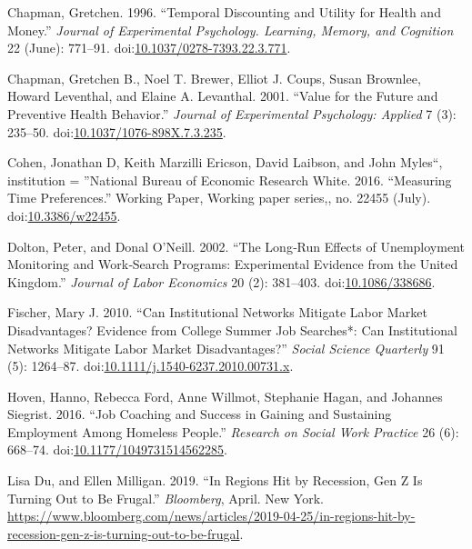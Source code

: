 \documentclass[]{elsarticle} %
\begin{document}
\hypertarget{ref-Chapman_1996}{}
Chapman, Gretchen. 1996. ``Temporal Discounting and Utility for Health
and Money.'' \emph{Journal of Experimental Psychology. Learning, Memory,
and Cognition} 22 (June): 771--91.
doi:\href{https://doi.org/10.1037/0278-7393.22.3.771}{10.1037/0278-7393.22.3.771}.

\hypertarget{ref-chapman_value_2001}{}
Chapman, Gretchen B., Noel T. Brewer, Elliot J. Coups, Susan Brownlee,
Howard Leventhal, and Elaine A. Levanthal. 2001. ``Value for the Future
and Preventive Health Behavior.'' \emph{Journal of Experimental
Psychology: Applied} 7 (3): 235--50.
doi:\href{https://doi.org/10.1037/1076-898X.7.3.235}{10.1037/1076-898X.7.3.235}.

\hypertarget{ref-NBERw22455}{}
Cohen, Jonathan D, Keith Marzilli Ericson, David Laibson, and John
Myles``, institution = ''National Bureau of Economic Research White.
2016. ``Measuring Time Preferences.'' Working Paper, Working paper
series,, no. 22455 (July).
doi:\href{https://doi.org/10.3386/w22455}{10.3386/w22455}.

\hypertarget{ref-dolton_longrun_2002}{}
Dolton, Peter, and Donal O'Neill. 2002. ``The Long‐Run Effects of
Unemployment Monitoring and Work‐Search Programs: Experimental Evidence
from the United Kingdom.'' \emph{Journal of Labor Economics} 20 (2):
381--403. doi:\href{https://doi.org/10.1086/338686}{10.1086/338686}.

\hypertarget{ref-fischer_can_2010}{}
Fischer, Mary J. 2010. ``Can Institutional Networks Mitigate Labor
Market Disadvantages? Evidence from College Summer Job Searches*: Can
Institutional Networks Mitigate Labor Market Disadvantages?''
\emph{Social Science Quarterly} 91 (5): 1264--87.
doi:\href{https://doi.org/10.1111/j.1540-6237.2010.00731.x}{10.1111/j.1540-6237.2010.00731.x}.

\hypertarget{ref-hoven_job_2016}{}
Hoven, Hanno, Rebecca Ford, Anne Willmot, Stephanie Hagan, and Johannes
Siegrist. 2016. ``Job Coaching and Success in Gaining and Sustaining
Employment Among Homeless People.'' \emph{Research on Social Work
Practice} 26 (6): 668--74.
doi:\href{https://doi.org/10.1177/1049731514562285}{10.1177/1049731514562285}.

\hypertarget{ref-lisa_du_regions_2019}{}
Lisa Du, and Ellen Milligan. 2019. ``In Regions Hit by Recession, Gen Z
Is Turning Out to Be Frugal.'' \emph{Bloomberg}, April. New York.
\url{https://www.bloomberg.com/news/articles/2019-04-25/in-regions-hit-by-recession-gen-z-is-turning-out-to-be-frugal}.
\end{document}
